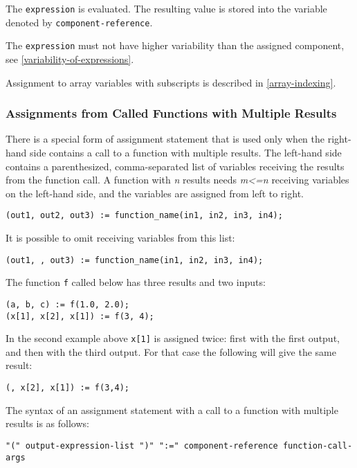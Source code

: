 The \lstinline[language=grammar]!expression! is evaluated.
The resulting value is stored into the variable denoted by \lstinline[language=grammar]!component-reference!.

The \lstinline!expression! must not have higher variability than the assigned component, see \cref{variability-of-expressions}.

Assignment to array variables with subscripts is described in \cref{array-indexing}.


\subsubsection{Assignments from Called Functions with Multiple Results}\label{assignments-from-called-functions-with-multiple-results}

There is a special form of assignment statement that is used only when
the right-hand side contains a call to a function with multiple results.
The left-hand side contains a parenthesized, comma-separated list of
variables receiving the results from the function call. A function with
\emph{n} results needs \emph{m\textless{}=n} receiving variables on the
left-hand side, and the variables are assigned from left to right.

\begin{lstlisting}[language=modelica]
(out1, out2, out3) := function_name(in1, in2, in3, in4);
\end{lstlisting}

It is possible to omit receiving variables from this list:
\begin{lstlisting}[language=modelica]
(out1, , out3) := function_name(in1, in2, in3, in4);
\end{lstlisting}

\begin{example}
The function \lstinline!f! called below has three results and two inputs:
\begin{lstlisting}[language=modelica]
(a, b, c) := f(1.0, 2.0);
(x[1], x[2], x[1]) := f(3, 4);
\end{lstlisting}
In the second example above \lstinline!x[1]! is assigned twice: first with the first output, and then with the third output.  For that case the following will give the same result:
\begin{lstlisting}[language=modelica]
(, x[2], x[1]) := f(3,4);
\end{lstlisting}
\end{example}

The syntax of an assignment statement with a call to a function with
multiple results is as follows:
\begin{lstlisting}[language=grammar]
"(" output-expression-list ")" ":=" component-reference function-call-args
\end{lstlisting}

